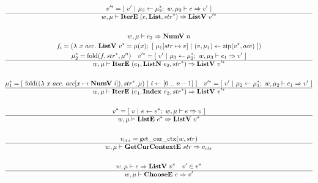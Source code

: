 \begin{gather*}
  \seq{v'} =
    [ ~
      v'
    ~ | ~
      \mu_3 \leftarrow \seq {\mu_2}; ~ w, \mu_3 \vdash e \Rightarrow v'
    ~ ] \\
  \hline
  w, \mu \vdash \itere ~ (e, \listiter, \seq{str}) \Rightarrow \listv ~ \seq{v'} \\
%
\newline \\
  w, \mu \vdash e_2 \Rightarrow \numv ~ n \\
  f_i =
    (\lambda ~ x ~ acc. ~
      \listv ~ \seq v = \mu(x); ~
      [ ~ \mu_1[str \mapsto v] ~ | ~ (v, \mu_1) \leftarrow \zip (\seq v, acc) ~ ]
    )
  \\
  \seq{\mu_2} = \fold(f, \seq{str}, \mu^n) \quad
  \seq{v'} =
    [ ~
      v'
    ~ | ~
      \mu_3 \leftarrow \seq {\mu_2}; ~ w, \mu_3 \vdash e_1 \Rightarrow v'
    ~ ] \\
  \hline
  w, \mu \vdash \itere ~ (e_1, \listniter ~ e_2, \seq{str}) \Rightarrow \listv ~ \seq{v'} \\
%
\newline \\
  \seq{\mu_1} =
    [ ~
      \fold(
        (\lambda ~ x ~ acc. ~ acc[x \mapsto \numv ~ i]),
        \seq{str},
        \mu
      )
    ~ | ~
      i \leftarrow [0 ~ .. ~ n-1]
    ~ ]
  \quad
  \seq{v'} =
    [ ~
      v'
    ~ | ~
      \mu_2 \leftarrow \seq {\mu_1}; ~ w, \mu_2 \vdash e_1 \Rightarrow v'
    ~ ] \\
  \hline
  w, \mu \vdash \itere ~ (e_1, \listidxiter ~ e_2, \seq{str}) \Rightarrow \listv ~ \seq{v'} \\
%
\newline \\
  \seq{v} = [ ~ v ~ | ~ e \leftarrow \seq{e}; ~ w, \mu \vdash e \Rightarrow v ~ ] \\
  \hline
  w, \mu \vdash \liste ~ \seq{e} \Rightarrow \listv ~ \seq{v} \\
%
\newline \\
  v_{ctx} = \getcurctx(w, str) \\
  \hline
  w, \mu \vdash \getcurctxe ~ str \Rightarrow v_{ctx} \\
%
\newline \\
  w, \mu \vdash e \Rightarrow \listv ~ \seq{v} \quad
  v' \in \seq{v} \\
  \hline
  w, \mu \vdash \choosee ~ e \Rightarrow v' \\
%
\newline \\

\end{gather*}
